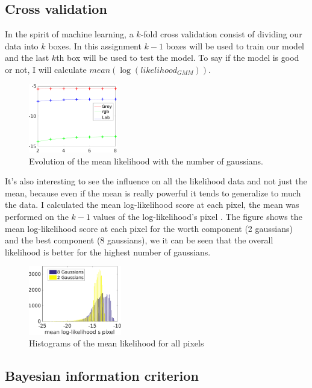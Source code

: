 \documentclass[runningheads,a4paper]{llncs}
\begin{document}
\subsection{Cross validation}
In the spirit of machine learning, a $k$-fold cross validation consist of dividing our data into $k$ boxes. In this assignment $k-1$ boxes will be used to train our model and the last $k$th box will be used to test the model. To say if the model is good or not, I will calculate $mean(\log(likelihood_{GMM}))$. 
\begin{figure}
\centering
\includegraphics[height=3cm]{Figures/mean_lklh}
\caption{Evolution of the mean likelihood with the number of gaussians.}
\end{figure}
\par It's also interesting to see the influence on all the likelihood data and not just the mean, because even if the mean is really powerful it tends to generalize to much the data. I calculated the mean log-likelihood score at each pixel, the mean was performed on the $k-1$ values of the log-likelihood's pixel . The figure shows the mean log-likelihood score at each pixel for the worth component (2 gaussians) and the best component (8 gaussians), we it can be seen that the overall likelihood is better for the highest number of gaussians.
\begin{figure}
\centering
\includegraphics[height=3cm]{Figures/hist_lklh}
\caption{Histograms of the mean likelihood for all pixels}
\end{figure}

\subsection{Bayesian information criterion}
\end{document}
